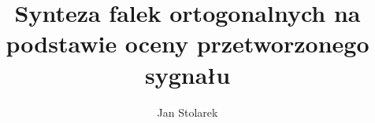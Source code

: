 \documentclass[a4paper,12pt,twoside]{book}
\author{Jan Stolarek}
\title{Synteza falek ortogonalnych na podstawie oceny przetworzonego sygnału}
\begin{document}
\frontmatter

\tableofcontents

\mainmatter
\pagestyle{headings}









\appendix
\renewcommand{\chaptermark}[1]{%
\markboth{\MakeUppercase{%
DODATEK \thechapter.%
\ }}{}}


\end{document}

